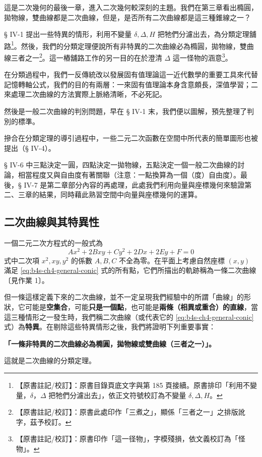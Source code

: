 這是二次幾何的最後一章，進入二次幾何較深刻的主題。我們在第三章看出橢圓，拋物線，雙曲線都是二次曲線，但是，是否所有二次曲線都是這三種錐線之一？

§ IV-1 提出一些特異的情形，利用不變量 $\delta, \Delta, H$ 把牠們分濾出去，為分類定理舖路\label{note:b4s-ch4-intro-pulu}\footnote{【原書註記/校訂】：原書目錄頁底文字與第 185 頁接續。原書排印「利用不變量，$\delta$，$\Delta$ 把牠們分濾出去」，依正文符號校訂為不變量 $\delta, \Delta, H$。}。然後，我們的分類定理便說所有非特異的二次曲線必為橢圓，拋物線，雙曲線三者之一\label{note:b4s-ch4-intro-sanzhe}\footnote{【原書註記/校訂】：原書此處印作「三煮之」，顯係「三者之一」之排版訛字，茲予校訂。}。這一樁舖路工作的另一目的在於澄清 $\Delta$ 這一怪物的涵意\label{note:b4s-ch4-intro-guaiwu}\footnote{【原書註記/校訂】：原書印作「這一径物」，字模殘損，依文義校訂為「怪物」。}。

在分類過程中，我們一反傳統改以發展固有值理論這一近代數學的重要工具來代替記憶轉軸公式，我們的目的有兩層：一來固有值理論本身含意頗長，深值學習；二來處理二次曲線的方法實際上脈絡清晰，不必死記。

然後是一般二次曲線的判別問題，早在 § IV-1 末，我們便以圖解，預先整理了判別的標準。

摻合在分類定理的導引過程中，一些二元二次函數在空間中所代表的簡單圖形也被提出（§ IV-4）。

§ IV-6 中三點決定一圓，四點決定一拋物線，五點決定一個一般二次曲線的討論，相當程度又與自由度有著關聯（注意：一點換算為一個（度）自由度）。最後，§ IV-7 是第二章部分內容的再處理，此處我們利用向量與座標幾何來驗證第二、三章的結果，同時藉此熟習空間中向量與座標幾何的運算。


\subsection{二次曲線與其特異性}\label{sec:b4s-4-1}

一個二元二次方程式的一般式為
\begin{equation}
Ax^2 + 2Bxy + Cy^2 + 2Dx + 2Ey + F = 0
\label{eq:b4s-ch4-general-conic}
\end{equation}
式中二次項 $x^2, xy, y^2$ 的係數 $A, B, C$ 不全為零。在平面上考慮自然座標 $(x,y)$ 滿足 \eqref{eq:b4s-ch4-general-conic} 式的所有點，它們所描出的軌跡稱為一條二次曲線〔見作業 1〕。

但一條這樣定義下來的二次曲線，並不一定呈現我們經驗中的所謂「曲線」的形狀，它可能是\textbf{空集合}，可能\textbf{只是一個點}，也可能是\textbf{兩條（相異或重合）的直線}，當這三種情形之一發生時，我們稱二次曲線（或代表它的 \eqref{eq:b4s-ch4-general-conic} 式）為\textbf{特異}。在剔除這些特異情形之後，我們將證明下列重要事實：
\begin{center}
\textbf{「一條非特異的二次曲線必為橢圓，拋物線或雙曲線（三者之一）」。}
\end{center}
這就是二次曲線的分類定理。

